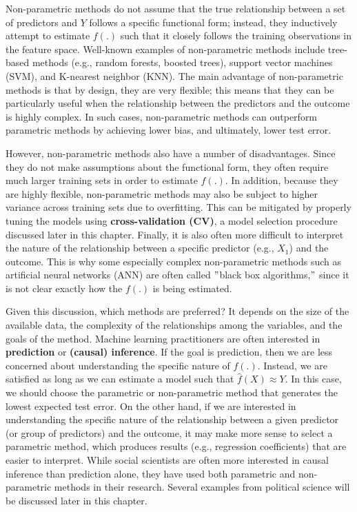 \documentclass{book}
\begin{document}
Non-parametric methods do not assume that the true relationship between a set
of predictors and \(Y\) follows a specific functional form; instead, they
inductively attempt to estimate \(f(.)\) such that it closely follows the
training observations in the feature space. Well-known examples of
non-parametric methods include tree-based methods (e.g., random forests,
boosted trees), support vector machines (SVM), and K-nearest neighbor (KNN).
The main advantage of non-parametric methods is that by design, they are very
flexible; this means that they can be particularly useful when the
relationship between the predictors and the outcome is highly complex. In such
cases, non-parametric methods can outperform parametric methods by achieving
lower bias, and ultimately, lower test error.

However, non-parametric methods also have a number of disadvantages. Since
they do not make assumptions about the functional form, they often require
much larger training sets in order to estimate \(f(.)\). In addition, because
they are highly flexible, non-parametric methods may also be subject to higher
variance across training sets due to overfitting. This can be mitigated by
properly tuning the models using \textbf{cross-validation (CV)}, a model
selection procedure discussed later in this chapter. Finally, it is also often
more difficult to interpret the nature of the relationship between a specific
predictor (e.g., \(X_{1}\)) and the outcome. This is why some especially
complex non-parametric methods such as artificial neural networks (ANN) are
often called \("\)black box algorithms,\("\) since it is not clear exactly how
the \(f(.)\) is being estimated.

Given this discussion, which methods are preferred? It depends on the size of
the available data, the complexity of the relationships among the variables,
and the goals of the method. Machine learning practitioners are often
interested in \textbf{prediction} or \textbf{(causal) inference}. If the goal
is prediction, then we are less concerned about understanding the specific
nature of \(f(.)\). Instead, we are satisfied as long as we can estimate a
model such that \(\hat{f}(X) \approx Y\). In this case, we should choose the
parametric or non-parametric method that generates the lowest expected test
error. On the other hand, if we are interested in understanding the specific
nature of the relationship between a given predictor (or group of predictors)
and the outcome, it may make more sense to select a parametric method, which
produces results (e.g., regression coefficients) that are easier to interpret.
While social scientists are often more interested in causal inference than
prediction alone, they have used both parametric and non-parametric methods in
their research. Several examples from political science will be discussed
later in this chapter.
\end{document}
